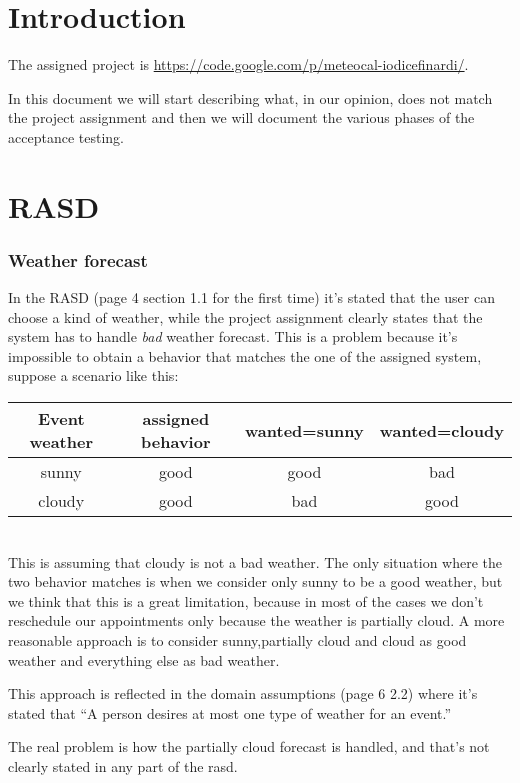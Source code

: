 \documentclass[10pt,a4paper,titlepage]{article}
\begin{document}


\tableofcontents

\pagebreak
\part{Introduction}
The assigned project is \url{https://code.google.com/p/meteocal-iodicefinardi/}.

In this document we will start describing what, in our opinion, does not match the project assignment and then we will document the various phases of the acceptance testing.

\pagebreak
\part{RASD}
\section{Weather forecast}
In the RASD (page 4 section 1.1 for the first time) it's stated that the user can choose a kind of weather, while the project assignment clearly states that the system has to handle \emph{bad} weather forecast. This is a problem because it's impossible to obtain a behavior that matches the one of the assigned system, suppose a scenario like this:\\
\begin{tabular}{|c|c|c|c|}
\hline 
Event weather & assigned behavior & wanted=sunny & wanted=cloudy \\ 
\hline 
sunny & good & good & bad \\ 
\hline 
cloudy & good & bad & good \\ 
\hline 
\end{tabular}\\
This is assuming that cloudy is not a bad weather. The only situation where the two behavior matches is when we consider only sunny to be a good weather, but we think that this is a great limitation, because in most of the cases we don't reschedule our appointments only because the weather is partially cloud. A more reasonable approach is to consider sunny,partially cloud and cloud as good weather and everything else as bad weather. 

This approach is reflected in the domain assumptions (page 6 2.2) where it's stated that ``A person desires at most one type of weather for an event.''

The real problem is how the partially cloud forecast is handled, and that's not clearly stated in any part of the rasd.
\end{document}
